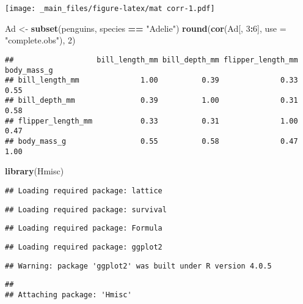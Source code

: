\documentclass[
]{book}
\newenvironment{Shaded}{\begin{snugshade}}{\end{snugshade}}
\newcommand{\DataTypeTok}[1]{\textcolor[rgb]{0.13,0.29,0.53}{#1}}
\newcommand{\DecValTok}[1]{\textcolor[rgb]{0.00,0.00,0.81}{#1}}
\newcommand{\KeywordTok}[1]{\textcolor[rgb]{0.13,0.29,0.53}{\textbf{#1}}}
\newcommand{\NormalTok}[1]{#1}
\newcommand{\OperatorTok}[1]{\textcolor[rgb]{0.81,0.36,0.00}{\textbf{#1}}}
\newcommand{\StringTok}[1]{\textcolor[rgb]{0.31,0.60,0.02}{#1}}
\begin{document}
\texttt{[image: \_main\_files/figure-latex/mat corr-1.pdf]}

\begin{Shaded}
\begin{Highlighting}[]
\NormalTok{Ad <-}\StringTok{ }\KeywordTok{subset}\NormalTok{(penguins, species }\OperatorTok{==}\StringTok{ "Adelie"}\NormalTok{)}
\KeywordTok{round}\NormalTok{(}\KeywordTok{cor}\NormalTok{(Ad[, }\DecValTok{3}\OperatorTok{:}\DecValTok{6}\NormalTok{], }\DataTypeTok{use =} \StringTok{"complete.obs"}\NormalTok{), }\DecValTok{2}\NormalTok{)}
\end{Highlighting}
\end{Shaded}

\begin{verbatim}
##                   bill_length_mm bill_depth_mm flipper_length_mm body_mass_g
## bill_length_mm              1.00          0.39              0.33        0.55
## bill_depth_mm               0.39          1.00              0.31        0.58
## flipper_length_mm           0.33          0.31              1.00        0.47
## body_mass_g                 0.55          0.58              0.47        1.00
\end{verbatim}

\begin{Shaded}
\begin{Highlighting}[]
\KeywordTok{library}\NormalTok{(Hmisc)}
\end{Highlighting}
\end{Shaded}

\begin{verbatim}
## Loading required package: lattice
\end{verbatim}

\begin{verbatim}
## Loading required package: survival
\end{verbatim}

\begin{verbatim}
## Loading required package: Formula
\end{verbatim}

\begin{verbatim}
## Loading required package: ggplot2
\end{verbatim}

\begin{verbatim}
## Warning: package 'ggplot2' was built under R version 4.0.5
\end{verbatim}

\begin{verbatim}
## 
## Attaching package: 'Hmisc'
\end{verbatim}
\end{document}
